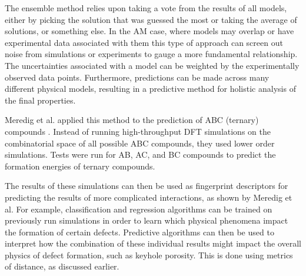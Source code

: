 The ensemble method relies upon taking a vote from the results of all models, either by picking the solution that was guessed the most or taking the average of solutions, or something else. In the AM case, where models may overlap or have experimental data associated with them this type of approach can screen out noise from simulations or experiments to gauge a more fundamental relationship. The uncertainties associated with a model can be weighted by the experimentally observed data points. Furthermore, predictions can be made across many different physical models, resulting in a predictive method for holistic analysis of the final properties.

Meredig et al. applied this method to the prediction of ABC (ternary) compounds \cite{Meredig2014}. Instead of running high-throughput DFT simulations on the combinatorial space of all possible ABC compounds, they used lower order simulations. Tests were run for AB, AC, and BC compounds to predict the formation energies of ternary compounds.

The results of these simulations can then be used as fingerprint descriptors for predicting the results of more complicated interactions, as shown by Meredig et al. For example, classification and regression algorithms can be trained on previously run simulations in order to learn which physical phenomena impact the formation of certain defects. Predictive algorithms can then be used to interpret how the combination of these individual results might impact the overall physics of defect formation, such as keyhole porosity. This is done using metrics of distance, as discussed earlier. 